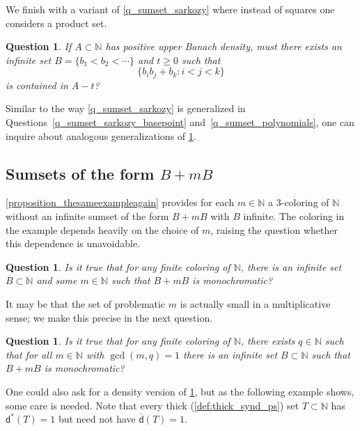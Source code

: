 \documentclass[10pt,dvipsnames]{article}
\newtheorem{question}[theorem]{Question}
\theoremstyle{definition}
\theoremstyle{plain}
\newcommand{\N}{\mathbb{N}}
\newcommand{\udens}{\overline{\mathsf{d}}}
\newcommand{\ubdens}{\mathsf{d}^*}
\begin{document}
We finish with a variant of \cref{q_sumset_sarkozy} where instead of squares one considers a product set.
\begin{question}
\label{q_sumset_itereated_sarkozy}
If $A\subset\N$ has positive upper Banach density, must there exists an infinite set $B=\{b_1< b_2<\cdots\}$ and $t\geq 0$ such that
\begin{equation*}
\{b_ib_j+b_k: i<j<k\}
\end{equation*}
is contained in $A-t$?
\end{question}
Similar to the way \cref{q_sumset_sarkozy} is generalized in  Questions~\ref{q_sumset_sarkozy_basepoint} and~\ref{q_sumset_polynomials}, one can inquire about analogous generalizations of \cref{q_sumset_itereated_sarkozy}.

\subsection{Sumsets of the form \texorpdfstring{$B+mB$}{B+mB}}
\label{sec:general-equations}


\cref{proposition_thesameexampleagain} provides for each $m\in\N$ a $3$-coloring of $\N$ without an infinite sumset of the form $B+mB$ with $B$ infinite. 
The coloring in the example depends heavily on the choice of $m$, raising the question whether this dependence is unavoidable.


\begin{question}
\label{question_withmultiplicativehints_coloring2}
Is it true that  for any finite coloring of $\N$, there is an infinite set $B \subset \N$ and some $m \in \N$ such that $B+mB$ is monochromatic?
\end{question}

It may be that the set of problematic $m$ is actually small in a multiplicative sense; we make this precise in the next question.

\begin{question}
\label{question_withmultiplicativehints_coloring}
Is it true that for any finite coloring of $\N$, there exists $q\in \N$ such that for all $m\in\N$ with $\gcd(m,q)=1$ there is an infinite set $B\subset \N$ such that  $B+mB$ is monochromatic?
\end{question}

One could also ask for a density version of \cref{question_withmultiplicativehints_coloring2}, but as the following example shows, some care is needed. 
Note that every thick (\cref{def:thick_synd_ps}) set $T \subset \N$ has $\ubdens(T) = 1$ but need not have $\udens(T) = 1$.
\end{document}
